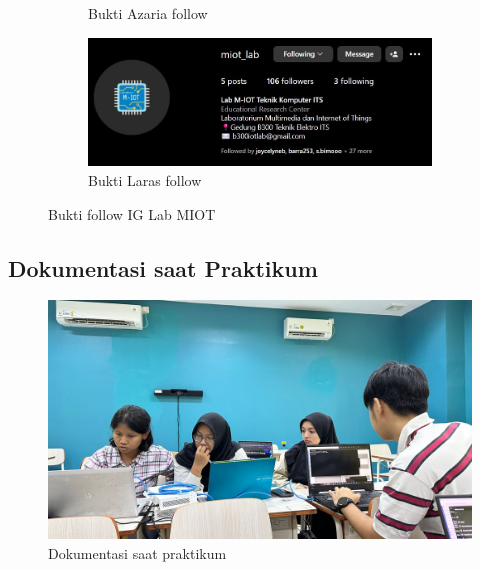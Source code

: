 \begin{enumerate}
\begin{figure}[H]
\begin{subfigure}{0.3\linewidth}
			\caption{Bukti Azaria follow}
			\label{fig:gambar36}
		\end{subfigure}
		\begin{subfigure}{0.8\linewidth}
			\centering
			\includegraphics[width=\linewidth]{P1/img/larasfollow.jpg}
			\caption{Bukti Laras follow}
			\label{fig:gambar37}
		\end{subfigure}
		\caption{Bukti follow IG Lab MIOT}
		\label{fig:dua_gambar}
	\end{figure}
	
\end{enumerate}
\subsection{Dokumentasi saat Praktikum}
	\begin{figure}[H]
		\centering
		\includegraphics[width=0.5\linewidth]{P1/img/dokumpraktikum.jpg}
		\caption{Dokumentasi saat praktikum}
		\label{fig:gambar15}
	\end{figure}